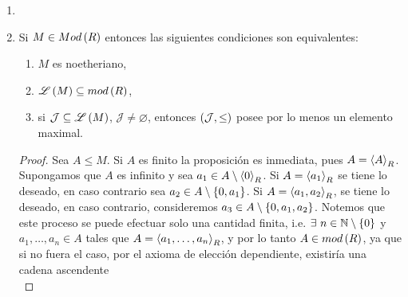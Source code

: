 \documentclass{article}
\begin{document}
\begin{enumerate}[label=\textbf{Ej \arabic*.}]
\begin{proof}
	$\boxed{\Leftarrow )}$ Sean $\mathfrak{A}=\fntfam{A}{i}{n}$ y $\mathfrak{C}=\fntfam{C}{j}{m}$ series de composición para $A$ y $C$, respectivamente. Luego, los $f(A_{i})$ y los $g^{-1}(C_{j})$ son submódulos de $B$. Definimos la serie $\mathfrak{B}=\fntfam{B}{t}{m+n}$, donde $B_{t}=f(A_{t})$ si $t \leq n$ y $B_{t}=g^{-1}(C_{t-n})$ si $n+1 \leq t \leq n+m$.\\
	
	Ahora, dado que $f$ es un monomorfismo, se tiene que $B_{t} \cong A_{t}$, para $t \leq n$. Y por otro lado, el teorema de la correspondencia y el tercer teorema de isomorfismo garantizan que $\displaystyle\frac{B_{t+1}}{B_{t}} = \displaystyle\frac{g^{-1}(C_{t+1})}{g^{-1}(C_{t})} \cong \displaystyle\frac{C_{t-n+1}}{C_{t-n}}$ para cada $n+1 \leq t \leq n+m$. Más aún, tenemos que los cocientes $\displaystyle\frac{B_{t+1}}{B_{t}}$ son simples, toda vez que los cocientes $\displaystyle\frac{A_{i+1}}{A_{i}}$ y $\displaystyle\frac{C_{j+1}}{C_{j}}$ lo son. De esta forma $\mathfrak{B}$ es una serie de composición para $B$. $\therefore B \in f.l.\lrprth{R}$
\end{proof}
\item
\item Si $M\in Mod\left(R\right)$ entonces las siguientes condiciones son equivalentes:
\begin{enumerate}
	\item $M$ es noetheriano,
	\item $\mathscr{L}\left(M\right)\subseteq mod\left(R\right)$,
	\item si $\mathcal{J}\subseteq\mathscr{L}\left(M\right)$, $\mathcal{J}\neq\varnothing$, entonces $\left(\mathcal{J},\leq\right)$ posee por lo menos un elemento maximal.
\end{enumerate}
\begin{proof}
	 Sea $A\leq M$. Si $A$ es finito la proposición es inmediata, pues $A=\left< A\right>_{R}$. Supongamos que $A$ es infinito y sea  $a_1\in A\setminus\left< 0\right>_{R}$. Si $A=\left< a_1\right>_{R}$ se tiene lo deseado, en caso contrario sea $a_2\in A\setminus\left\{0,a_1\right\}$. Si $A=\left< a_1,a_2\right>_{R}$, se tiene lo deseado, en caso contrario, consideremos $a_3\in A\setminus\left\{0,a_1,a_2\right\}$. Notemos que este proceso se puede efectuar solo una cantidad finita, i.e. $\exists\ n\in\mathbb{N}\setminus\left\{0\right\}$ y $a_1,\dotsc,a_n\in A$ tales que $A=\left< a_1,\dotsc,a_n\right>_{R}$, y por lo tanto $A\in mod\left(R\right)$, ya que si no fuera el caso, por el axioma de elección dependiente, existiría una cadena ascendente
	\begin{equation*}

\end{equation*}
\end{proof}
\end{enumerate}
\end{document}
